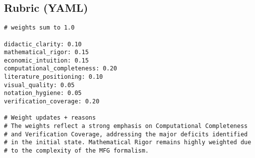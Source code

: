 ﻿\documentclass[11pt,letterpaper,oneside]{article}
\numberwithin{equation}{section}
\newcommand{\1}{\mathbf{1}}
\begin{document}
\begin{tcolorbox}[didacticstyle]
\begin{itemize}[leftmargin=1.1em,itemsep=0.25em]
\subsection*{Rubric (YAML)}
\begin{tcolorbox}[sympycheckstyle,title={Replication Rubric (YAML)}]
\begin{Verbatim}[fontsize=\small]
# weights sum to 1.0

didactic_clarity: 0.10
mathematical_rigor: 0.15
economic_intuition: 0.15
computational_completeness: 0.20
literature_positioning: 0.10
visual_quality: 0.05
notation_hygiene: 0.05
verification_coverage: 0.20

# Weight updates + reasons
# The weights reflect a strong emphasis on Computational Completeness
# and Verification Coverage, addressing the major deficits identified
# in the initial state. Mathematical Rigor remains highly weighted due
# to the complexity of the MFG formalism.
\end{Verbatim}
\end{tcolorbox}


\end{itemize}
\end{tcolorbox}
\end{document}
